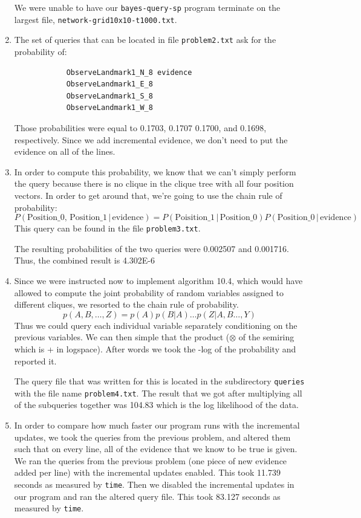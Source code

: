 \documentclass[11pt,a4paper]{article}
\begin{document}
\begin{enumerate}
		We were unable to have our {\tt bayes-query-sp} program terminate on the largest file,
		{\tt network-grid10x10-t1000.txt}.
		
		\item The set of queries that can be located in file {\tt problem2.txt} ask for the probability
		of:
		\begin{verbatim}
		    ObserveLandmark1_N_8 evidence
		    ObserveLandmark1_E_8
		    ObserveLandmark1_S_8
		    ObserveLandmark1_W_8
		\end{verbatim}
		Those probabilities were equal to 0.1703, 0.1707 0.1700, and 0.1698, respectively. Since
		we add incremental evidence, we don't need to put the evidence on all of the lines.

		\item In order to compute this probability, we know that we can't simply perform
		the query because there is no clique in the clique tree with all four position vectors.
		In order to get around that, we're going to use the chain rule of probability:
		\[P(\textrm{Position\_0, Position\_1} \,|\, \textrm{evidence}) = 
		P(\textrm{Poisition\_1} \,|\, \textrm{Position\_0})P(\textrm{Position\_0} \,|\, \textrm{evidence})\]	
		This query can be found in the file {\tt problem3.txt}.
		
		The resulting probabilities of the two queries were 0.002507 and 0.001716. Thus, the
		combined result is 4.302E-6
		
		\item Since we were instructed now to implement algorithm 10.4, which would have allowed to compute the joint probability of random variables assigned to different cliques, we resorted to the chain rule of probability. 
		$$
		p(A,B,\ldots,Z) = p(A)p(B|A)\ldots p(Z|A,B\ldots,Y)
		$$
		Thus we could query each individual variable separately conditioning on the previous 
		variables. We can then simple that the product ($\otimes$ of the semiring which is + 
		in logspace). After words we took the -log of the probability and reported it. 
		
		The query file that was written for this is located in the subdirectory {\tt queries}
		with the file name {\tt problem4.txt}. The result that we got after multiplying all of
		the subqueries together was 104.83 which is the log likelihood of the data.
		
		\item In order to compare how much faster our program runs with the incremental
		updates, we took the queries from the previous problem, and altered them such that
		on every line, all of the evidence that we know to be true is given. We ran the queries
		from the previous problem (one piece of new evidence added per line) with the 
		incremental updates enabled. This took 11.739 seconds as measured by {\tt time}.
		Then we disabled the incremental updates in our program and ran the altered
		query file. This took 83.127 seconds as measured by {\tt time}. 
		

\end{enumerate}
\end{document}
